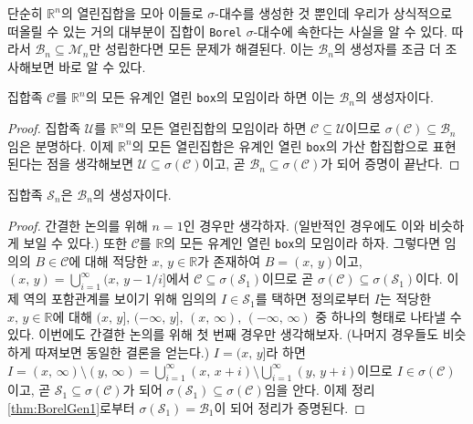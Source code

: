 단순히 $\mathbb{R}^n$의 열린집합을 모아 이들로 $\sigma$-대수를 생성한 것 뿐인데 우리가 상식적으로 떠올릴 수 있는 거의 대부분이 집합이 \texttt{Borel} $\sigma$-대수에 속한다는 사실을 알 수 있다. 따라서 $\mathcal{B}_n\subseteq\mathcal{M}_n$만 성립한다면 모든 문제가 해결된다. 이는 $\mathcal{B}_n$의 생성자를 조금 더 조사해보면 바로 알 수 있다.

\begin{theorem}\label{thm:BorelGen1}
    집합족 $\mathcal{C}$를 $\mathbb{R}^n$의 모든 유계인 열린 \texttt{box}의 모임이라 하면 이는 $\mathcal{B}_n$의 생성자이다.
\end{theorem}

\begin{proof}
    집합족 $\mathcal{U}$를 $\mathbb{R}^n$의 모든 열린집합의 모임이라 하면 $\mathcal{C}\subseteq\mathcal{U}$이므로 $\sigma(\mathcal{C})\subseteq\mathcal{B}_n$임은 분명하다. 이제 $\mathbb{R}^n$의 모든 열린집합은 유계인 열린 \texttt{box}의 가산 합집합으로 표현된다는 점\footnotemark\label{note:countableOpenBox}을 생각해보면 $\mathcal{U}\subseteq\sigma(\mathcal{C})$이고, 곧 $\mathcal{B}_n\subseteq\sigma(\mathcal{C})$가 되어 증명이 끝난다.
\end{proof}

\begin{theorem}\label{thm:BorelGen2}
    집합족 $\mathcal{S}_n$은 $\mathcal{B}_n$의 생성자이다.
\end{theorem}

\begin{proof}
    간결한 논의를 위해 $n=1$인 경우만 생각하자. (일반적인 경우에도 이와 비슷하게 보일 수 있다.) 또한 $\mathcal{C}$를 $\mathbb{R}$의 모든 유계인 열린 \texttt{box}의 모임이라 하자. 그렇다면 임의의 $B\in\mathcal{C}$에 대해 적당한 $x,\,y\in\mathbb{R}$가 존재하여 $B=(x,\,y)$이고, $(x,\,y)=\bigcup_{i=1}^\infty(x,\,y-1/i]$에서 $\mathcal{C}\subseteq\sigma(\mathcal{S}_1)$이므로 곧 $\sigma(\mathcal{C})\subseteq\sigma(\mathcal{S}_1)$이다. 이제 역의 포함관계를 보이기 위해 임의의 $I\in\mathcal{S}_1$를 택하면 정의로부터 $I$는 적당한 $x,\,y\in\mathbb{R}$에 대해 $(x,\,y],\,(-\infty,\,y],\,(x,\,\infty),\,(-\infty,\,\infty)$ 중 하나의 형태로 나타낼 수 있다. 이번에도 간결한 논의를 위해 첫 번째 경우만 생각해보자. (나머지 경우들도 비슷하게 따져보면 동일한 결론을 얻는다.) $I=(x,\,y]$라 하면 $I=(x,\,\infty)\setminus(y,\,\infty)=\bigcup_{i=1}^\infty(x,\,x+i)\setminus\bigcup_{i=1}^\infty(y,\,y+i)$이므로 $I\in\sigma(\mathcal{C})$이고, 곧 $\mathcal{S}_1\subseteq\sigma(\mathcal{C})$가 되어 $\sigma(\mathcal{S}_1)\subseteq\sigma(\mathcal{C})$임을 안다. 이제 정리 \ref{thm:BorelGen1}로부터 $\sigma(\mathcal{S}_1)=\mathcal{B}_1$이 되어 정리가 증명된다.
\end{proof}

